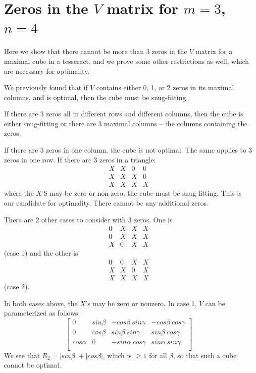 \section*{Zeros in the $V$ matrix for $m = 3$, $n = 4$}

Here we show that there cannot be more than 3 zeros in the $V$ matrix
for a maximal cube in a tesseract, and we prove some other restrictions
as well, which are necessary for optimality.

We previously found that if $V$ contains either 0, 1, or 2 zeros in its
maximal columns, and is optimal, then the cube must be snug-fitting.

If there are 3 zeros all in different rows and different columns, then
the cube is either snug-fitting or there are 3 maximal columns -- the
columns containing the zeros.

If there are 3 zeros in one column, the cube is not optimal. The same
applies to 3 zeros in one row. If there are 3 zeros in a triangle:
\begin{equation*}
\begin{array}{cccc}
X & X & 0 & 0 \\
X & X & X & 0 \\
X & X & X & X
\end{array}
\end{equation*}
where the $X$'S may be zero or non-zero, the cube must be snug-fitting.
This is our candidate for optimality. There cannot be any additional zeros.

There are 2 other cases to consider with 3 zeros. One is
\begin{equation*}
\label{refpage5}
\begin{array}{cccc}
0 & X & X & X \\
0 & X & X & X \\
X & 0 & X & X
\end{array}
\end{equation*}
(case 1) and the other is
\begin{equation*}
\begin{array}{cccc}
0 & 0 & X & X \\
X & X & 0 & X \\
X & X & X & X
\end{array}
\end{equation*}
(case 2).

In both cases above, the $X$'s may be zero or nonzero.  In case 1, $V$ can be
parameterized as follows:
\begin{equation*}
\left[
\begin{array}{ccrr}
   0      & sin\beta & -cos\beta ~sin\gamma & -cos\beta ~cos\gamma \\
   0      & cos\beta &  sin\beta ~sin\gamma &  sin\beta ~cos\gamma \\
cos\alpha &    0     & -sin\alpha~cos\gamma &  sin\alpha~sin\gamma \\
\end{array}
\right]
\end{equation*}
We see that $R_2 = |sin\beta| + |cos\beta|$, which is $\geq 1$ for all
$\beta$, so that such a cube cannot be optimal.

